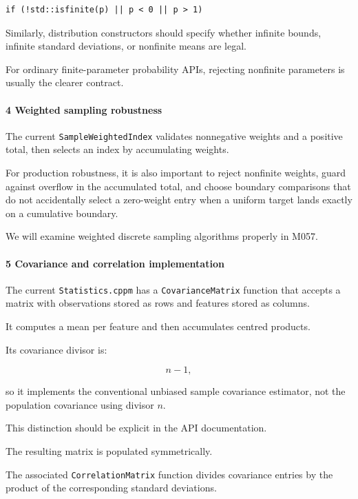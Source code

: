 \begin{verbatim}
if (!std::isfinite(p) || p < 0 || p > 1)
\end{verbatim}

Similarly, distribution constructors should specify whether infinite bounds, infinite standard deviations, or nonfinite means are legal.

For ordinary finite-parameter probability APIs, rejecting nonfinite parameters is usually the clearer contract.

\paragraph{4 Weighted sampling robustness}\label{02-foundations-ii-ch039-weighted-sampling-robustness}

The current \texttt{SampleWeightedIndex} validates nonnegative weights and a positive total, then selects an index by accumulating weights.

For production robustness, it is also important to reject nonfinite weights, guard against overflow in the accumulated total, and choose boundary comparisons that do not accidentally select a zero-weight entry when a uniform target lands exactly on a cumulative boundary.

We will examine weighted discrete sampling algorithms properly in M057.

\paragraph{5 Covariance and correlation implementation}\label{02-foundations-ii-ch039-covariance-and-correlation-implementation}

The current \texttt{Statistics.cppm} has a \texttt{CovarianceMatrix} function that accepts a matrix with observations stored as rows and features stored as columns.

It computes a mean per feature and then accumulates centred products.

Its covariance divisor is:

\[
 n-1,
\]

so it implements the conventional unbiased sample covariance estimator, not the population covariance using divisor \(n\).

This distinction should be explicit in the API documentation.

The resulting matrix is populated symmetrically.

The associated \texttt{CorrelationMatrix} function divides covariance entries by the product of the corresponding standard deviations.

